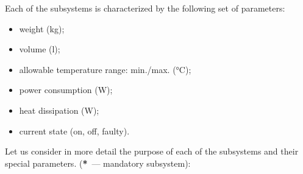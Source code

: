 \documentclass[12pt,a4paper]{article}
\begin{document}
Each of the subsystems is characterized by the following set of parameters:

\begin{itemize}
\item weight (kg);
\item volume (l);
\item allowable temperature range: min./max. (°C);
\item power consumption (W);
\item heat dissipation (W);
\item current state (on, off, faulty).
\end{itemize}

Let us consider in more detail the purpose of each of the subsystems and their special parameters.
(\textbf{*}~--- mandatory subsystem):
\end{document}
